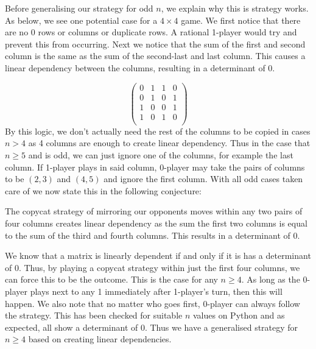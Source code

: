 \documentclass[11pt]{article}
\newcommand{\keywordfont}{\textsc}
\newcommand{\keyword}[1]{%
  \marginpar{\raggedright\small\keywordfont{#1}}}
\begin{document}
Before generalising our strategy for odd $n$, we explain why this is strategy works. As below, we see one potential case for a $4 \times 4$ game. We first notice that there are no 0 rows or columns or duplicate rows. A rational 1-player would try and prevent this from occurring. Next we notice that the sum of the first and second column is the same as the sum of the second-last and last column. This causes a linear dependency between the columns, resulting in a determinant of 0. 

\[
\left( \begin{array}{cccc}
0 & 1 & 1 & 0 \\
0 & 1 & 0 & 1 \\
1 & 0 & 0 & 1 \\
1 & 0 & 1 & 0 \\
\end{array} \right)
\]
By this logic, we don't actually need the rest of the columns to be copied in cases $n > 4$ as 4 columns are enough to create linear dependency. Thus in the case that $n \geq 5$ and is odd, we can just ignore one of the columns, for example the last column. If 1-player plays in said column, 0-player may take the pairs of columns to be $(2, 3)$ and $(4,5)$ and ignore the first column. With all odd cases taken care of we now state this in the following conjecture:

The copycat strategy \keyword{Conjecture} of mirroring our opponents moves within any two pairs of four columns creates linear dependency as the sum the first two columns is equal to the sum of the third and fourth columns. This results in a determinant of 0.

We know that a \keyword{Justification} matrix is linearly dependent if and only if it is has a determinant of 0. Thus, by playing a copycat strategy within just the first four columns, we can force this to be the outcome. This is the case for any $n \geq 4$. As long as the 0-player plays next to any 1 immediately after 1-player's turn, then this will happen. We also note that no matter who goes first, 0-player can always follow the strategy. This has been checked \keyword{Check} for suitable $n$ values on Python and as expected, all show a determinant of 0. Thus we have a generalised strategy for $n\geq 4$ based on creating linear dependencies. 



\end{document}
